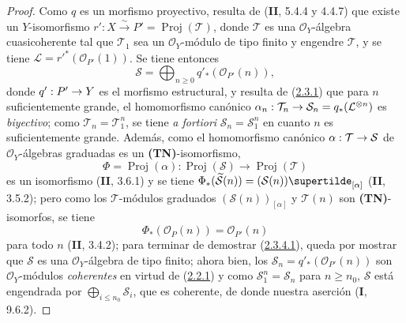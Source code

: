 \documentclass[10pt,oneside,openany]{book}
\theoremstyle{egaenv}\newtheorem*{env}{---}
\theoremstyle{egastatement}
\theoremstyle{egadescription}
\renewcommand{\leq}{\leqslant}
\renewcommand{\geq}{\geqslant}
\renewcommand{\to}{\mathchoice{\longrightarrow}{\rightarrow}{\rightarrow}{\rightarrow}}
\begin{document}
\begin{proof}
Como $q$ es un morfismo proyectivo, resulta de (\textbf{II}, 5.4.4 y 4.4.7) que existe un $Y$-isomorfismo $r':X\xrightarrow{\sim}P'=\operatorname{Proj}(\mathcal T)$, donde $\mathcal T$ es una $\mathcal O_Y$-álgebra cuasicoherente tal que $\mathcal T_1$ sea un $\mathcal O_Y$-módulo de tipo finito y engendre $\mathcal T$, y se tiene $\mathcal L=r'^*(\mathcal O_{P'}(1))$. Se tiene entonces
\[
\mathcal S=\bigoplus_{n\geq0}q'_*(\mathcal O_{P'}(n)),
\]
donde $q':P'\to Y$ es el morfismo estructural, y resulta de (\hyperref[III.2.3.1-fr]{2.3.1}) que para $n$ suficientemente grande, el homomorfismo canónico $\alpha_n:\mathcal T_n\to\mathcal S_n=q_*(\mathcal L^{\otimes n})$ es \emph{biyectivo}; como $\mathcal T_n=\mathcal T_1^n$, se tiene \emph{a fortiori} $\mathcal S_n=\mathcal S_1^n$ en cuanto $n$ es suficientemente grande. Además, como el homomorfismo canónico $\alpha:\mathcal T\to\mathcal S$ de $\mathcal O_Y$-álgebras graduadas es un \textbf{(TN)}-isomorfismo,
\label{III.2.3.5.1-fr}
\[
\Phi=\operatorname{Proj}(\alpha):
\operatorname{Proj}(\mathcal S)\longrightarrow
\operatorname{Proj}(\mathcal T)
\]
es un isomorfismo (\textbf{II}, 3.6.1) y se tiene $\Phi_*(\widetilde{\mathcal S}(n))=(\mathcal S(n))\supertilde_{[\alpha]}$ (\textbf{II}, 3.5.2); pero como los $\mathcal T$-módulos graduados $(\mathcal S(n))_{[\alpha]}$ y $\mathcal T(n)$ son \textbf{(TN)}-isomorfos, se tiene \[
\Phi_*(\mathcal O_P(n))=\mathcal O_{P'}(n)
\] para todo $n$ (\textbf{II}, 3.4.2); para terminar de demostrar (\hyperref[III.2.3.4.1-fr]{2.3.4.1}), queda por mostrar que $\mathcal S$ es una $\mathcal O_Y$-álgebra de tipo finito; ahora bien, los $\mathcal S_n=q'_*(\mathcal O_{P'}(n))$ son $\mathcal O_Y$-módulos \emph{coherentes} en virtud de (\hyperref[III.2.2.1-fr]{2.2.1}) y como $\mathcal S_1^n=\mathcal S_n$ para $n\geq n_0$, $\mathcal S$ está engendrada por $\bigoplus_{i\leq n_0}\mathcal S_i$, que es coherente, de donde nuestra aserción (\textbf{I}, 9.6.2).


\end{proof}
\end{document}
